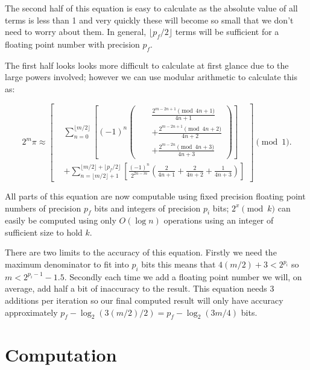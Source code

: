 \documentclass[11pt]{article}
\begin{document}
The second half of this equation is easy to calculate as the absolute value of all terms is less than 1 and very quickly these will become so small that we don't need to worry about them. In general, $\lfloor p_f/2 \rfloor$ terms will be sufficient for a floating point number with precision $p_f$.

The first half looks looks more difficult to calculate at first glance due to the large powers involved; however we can use modular arithmetic to calculate this as:

\begin{equation}
  2^m \pi \approx \left[
    \begin{aligned}
      &\sum_{n = 0}^{\lfloor m/2 \rfloor} \left[ (-1)^n \left(
        \begin{aligned}
          && \frac{2^{m-2n+1} \pmod{4n + 1}}{4n + 1} \\
          &&+ \frac{2^{m-2n+1} \pmod{4n + 2}}{4n + 2} \\
          &&+ \frac{2^{m-2n} \pmod{4n + 3}}{4n + 3}
        \end{aligned}
        \right) \right] \\
      &+ \sum_{n = \lfloor m/2 \rfloor+1}^{\lfloor m/2 \rfloor+\lfloor p_f/2 \rfloor} \left[ \frac{(-1)^n}{2^{2n-m}} \left( \frac{2}{4n + 1} + \frac{2}{4n + 2} + \frac{1}{4n + 3} \right) \right]
\end{aligned}
    \right] \pmod 1.
\end{equation}

All parts of this equation are now computable using fixed precision floating point numbers of precision $p_f$ bits and integers of precision $p_i$ bits; $2^x \pmod k$ can easily be computed using only $O(\log{n})$ operations \cite{Knuth_1995} using an integer of sufficient size to hold $k$.

There are two limits to the accuracy of this equation. Firstly we need the maximum denominator to fit into $p_i$ bits this means that $4(m/2)+3 < 2^{p_i}$ so $m < 2^{p_i-1}-1.5$. Secondly each time we add a floating point number we will, on average, add half a bit of inaccuracy to the result. This equation needs 3 additions per iteration so our final computed result will only have accuracy approximately $p_f - \log_2{(3(m/2)/2)} = p_f - \log_2(3m/4)$ bits.

\section{Computation}
\end{document}
